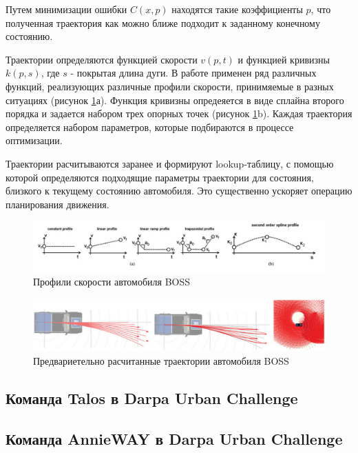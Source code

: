 Путем минимизации ошибки $C(x, p)$ находятся такие коэффициенты $p$, что полученная траектория как можно ближе подходит
к заданному конечному состоянию.

Траектории определяются функцией скорости $v(p, t)$ и функцией кривизны $k(p, s)$, где $s$ - покрытая длина дуги. В работе
применен ряд различных функций, реализующих различные профили скорости, принимяемые в разных ситуациях
(рисунок \ref{img:boss_velocity_prifiles}а). Функция кривизны опредеяется в виде сплайна второго порядка и задается
набором трех опорных точек (рисунок \ref{img:boss_velocity_prifiles}b). Каждая траектория определяется набором
параметров, которые подбираются в процессе оптимизации.

Траектории расчитываются заранее и формируют lookup-таблицу, с помощью которой определяются подходящие параметры траектории
для состояния, близкого к текущему состоянию автомобиля. Это существенно ускоряет операцию планирования движения.

\begin{figure}[h]
    \centering
    \includegraphics[width=\linewidth]{images/boss_velocity_prifiles}
    \caption{Профили скорости автомобиля BOSS}
    \label{img:boss_velocity_prifiles}
\end{figure}


\begin{figure}[h]
    \centering
    \includegraphics[width=\linewidth]{images/boss_lattice_gen}
    \caption{Предвариетельно расчитанные траектории автомобиля BOSS}
    \label{img:boss_lattice_gen}
\end{figure}

\subsection{Команда Talos в Darpa Urban Challenge}
\subsection{Команда AnnieWAY в Darpa Urban Challenge}